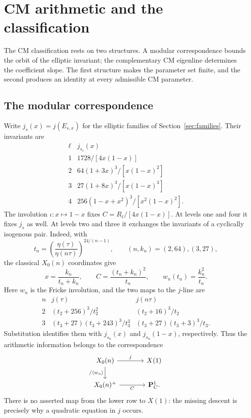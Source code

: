 \section{CM arithmetic and the classification}\label{sec:enumeration}

The CM classification rests on two structures.  A modular correspondence
bounds the orbit of the elliptic invariant; the complementary CM
eigenline determines the coefficient slope.  The first structure makes
the parameter set finite, and the second produces an identity at every
admissible CM parameter.

\subsection{The modular correspondence}

Write $j_s(x)=j(E_{s,x})$ for the elliptic families of
Section~\ref{sec:families}.  Their invariants are
\begin{equation}\label{eq:jmaps}
\begin{array}{c|c}
\ell&j_{s_\ell}(x)\\\hline
1&1728/[4x(1-x)]\\
2&64(1+3x)^3/[x(1-x)^2]\\
3&27(1+8x)^3/[x(1-x)^3]\\
4&256(1-x+x^2)^3/[x^2(1-x)^2].
\end{array}
\end{equation}
The involution $\iota:x\mapsto1-x$ fixes
$C=R_\ell/[4x(1-x)]$.  At levels one and four it fixes $j_s$ as
well.  At levels two and three it exchanges the invariants of a
cyclically isogenous pair.  Indeed, with
\[
 t_n=\left(\frac{\eta(\tau)}{\eta(n\tau)}\right)^{24/(n-1)},
 \qquad (n,k_n)=(2,64),(3,27),
\]
the classical $X_0(n)$ coordinates give
\[
 x=\frac{k_n}{t_n+k_n},\qquad
 C=\frac{(t_n+k_n)^2}{t_n},\qquad
 w_n(t_n)=\frac{k_n^2}{t_n}.
\]
Here $w_n$ is the Fricke involution, and the two maps to the
$j$-line are
\[
\begin{array}{c|cc}
 n&j(\tau)&j(n\tau)\\\hline
 2&(t_2+256)^3/t_2^2&(t_2+16)^3/t_2\\
 3&(t_3+27)(t_3+243)^3/t_3^3&(t_3+27)(t_3+3)^3/t_3.
\end{array}
\]
Substitution identifies them with $j_{s_n}(x)$ and
$j_{s_n}(1-x)$, respectively.  Thus the
arithmetic information belongs to the correspondence
\[
\begin{tikzcd}[column sep=large]
 X_0(n) \arrow[r,"j"] \arrow[d,"/\langle w_n\rangle"']
   & X(1)\\
 X_0(n)^+ \arrow[r,"C"'] & \mathbf P^1_C .
\end{tikzcd}
\]
There is no asserted map from the lower row to $X(1)$: the missing
descent is precisely why a quadratic equation in $j$ occurs.

